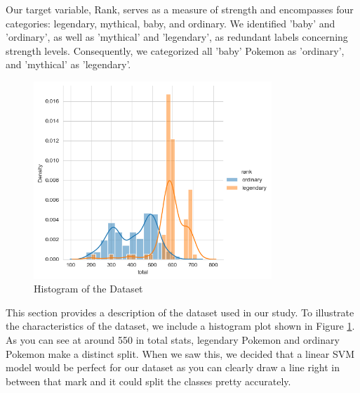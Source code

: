 \documentclass[conference]{IEEEtran}
\begin{document}
Our target variable, Rank, serves as a measure of strength and encompasses four categories: legendary, mythical, baby, and ordinary. We identified 'baby' and 'ordinary', as well as 'mythical' and 'legendary', as redundant labels concerning strength levels. Consequently, we categorized all 'baby' Pokemon as 'ordinary', and 'mythical' as 'legendary'.
    \begin{figure}[H]
        \centering
        \includegraphics[width=0.8\textwidth]{histplot.png} %
        \caption{Histogram of the Dataset}
        \label{fig:dataset-hist}
    \end{figure}
  This section provides a description of the dataset used in our study. To illustrate the characteristics of the dataset, we include a histogram plot shown in Figure \ref{fig:dataset-hist}. As you can see at around 550 in total stats, legendary Pokemon and ordinary Pokemon make a distinct split. When we saw this, we decided that a linear SVM model would be perfect for our dataset as you can clearly draw a line right in between that mark and it could split the classes pretty accurately. 
\end{document}

